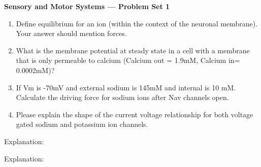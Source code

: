 \documentclass[plain,worksheet,]{inVerba-notes}
\begin{document}
\begin{center}
    \Large \textbf{Sensory and Motor Systems --- Problem Set 1}
\end{center}
\medskip
\begin{enumerate}
    \item Define equilibrium for an ion (within the context of the neuronal membrane). Your answer should mention forces.
    
    
    \vspace{80pt}
    
    \item What is the membrane potential at steady state in a cell with a membrane that is only permeable to calcium (Calcium out = 1.9mM, Calcium in= 0.0002mM)? 
    
    \vspace{80pt}

    \item If Vm is -70mV and external sodium is 145mM and internal is 10 mM. Calculate the driving force for sodium ions after Nav channels open.
    
    \vspace{120pt}

    \item Please explain the shape of the current voltage relationship for both voltage gated sodium and potassium ion channels.
\end{enumerate}
    \bigskip
    
    \begin{center}
        
    \end{center}

    Explanation:
    \vspace{80pt}
     
    \begin{center}
    
    \end{center}

    Explanation:
    \vspace{120pt}
\end{document}
